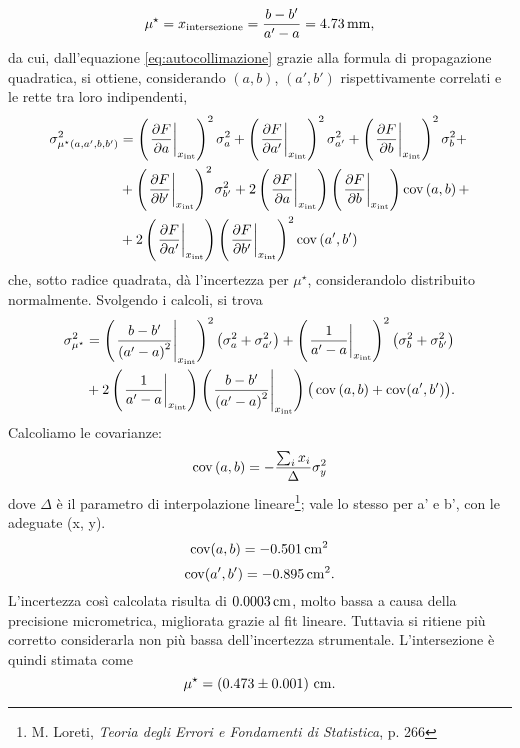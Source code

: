 \[ \mu ^{\star} = x_{\mathrm{intersezione}} = \frac{b - b'}{a' - a}  = 4.73 \,\mathrm{mm} , \]
da cui, dall'equazione \eqref{eq:autocollimazione} grazie alla formula di propagazione quadratica, si ottiene, considerando $\left(a, b\right)$, $\left(a', b'\right)$ rispettivamente correlati e le rette tra loro indipendenti,
\begin{equation*}
\begin{split} %
	\sigma^2_{\mu ^{\star}\left(a, a', b, b'\right)}  &= \left(\left.\frac{\partial F}{\partial a}\right|_{x_{\mathrm{int}}}\right)^2   \sigma^2_{a} + \left(\left.\frac{\partial F}{\partial a'}\right|_{x_{\mathrm{int}}}\right)^2   \sigma^2_{a'} + \left(\left.\frac{\partial F}{\partial b}\right|_{x_{\mathrm{int}}}\right)^2   \sigma^2_{b} +\\
								&+ \left(\left.\frac{\partial F}{\partial b'}\right|_{x_{\mathrm{int}}}\right)^2   \sigma^2_{b'} + 2\left(\left.\frac{\partial F}{\partial a}\right|_{x_{\mathrm{int}}}\right)\left(\left.\frac{\partial F}{\partial b}\right|_{x_{\mathrm{int}}}\right)   \cov\left(a, b\right) + \\
								&+ 2\left(\left.\frac{\partial F}{\partial a'}\right|_{x_{\mathrm{int}}}\right)\left(\left.\frac{\partial F}{\partial b'}\right|_{x_{\mathrm{int}}}\right)^2   \cov \left(a', b'\right)
\end{split}
\end{equation*}
che, sotto radice quadrata, d\`a l'incertezza per $ \mu ^{\star} $, considerandolo distribuito normalmente.
Svolgendo i calcoli, si trova
\begin{equation}
\begin{split}
\sigma^2_{\mu ^{\star}}  &=  \left(\left.\frac{b - b'}{\left(a' - a\right)^2}\right|_{x_{\mathrm{int}}}\right)^2 \left(\sigma^2_{a} + \sigma^2_{a'}\right) + \left(\left.\frac{1}{a'- a}\right|_{x_{\mathrm{int}}}\right)^2   \left(\sigma^2_{b} + \sigma^2_{b'}\right) \\
						 &+ 2 \left(\left.\frac{1}{a'- a}\right|_{x_{\mathrm{int}}}\right) \left(\left.\frac{b - b'}{\left(a' - a\right)^2}\right|_{x_{\mathrm{int}}}\right) \big(\operatorname{cov}\left(a, b\right) + \operatorname{cov}(a', b') \big).
\end{split}
\end{equation}
Calcoliamo le covarianze:
\[ \operatorname{cov}\left(a, b\right) = -\frac{\sum_{i} x_i}{\Delta}\sigma_y^2 \] 
dove $\Delta$ \`e il parametro di interpolazione lineare\footnote{M. Loreti, \textit{Teoria degli Errori e Fondamenti di Statistica}, p. 266}; vale lo stesso per a' e b', con le adeguate (x, y).
\[\operatorname{cov}(a, b) = -0.501 \,\mathrm{cm}^2 \] 
\[\operatorname{cov}(a', b') = -0.895 \,\mathrm{cm}^2. \]
L'incertezza cos\`i calcolata risulta di $0.0003\,\mathrm{cm}$, molto bassa a causa della precisione micrometrica, migliorata grazie al fit lineare. Tuttavia si ritiene pi\`u corretto considerarla non pi\`u bassa dell'incertezza strumentale. L'intersezione \`e quindi stimata come
\[ \mu ^{\star} =  \left(0.473 \pm 0.001\right) \,\mathrm{cm}. \] 

